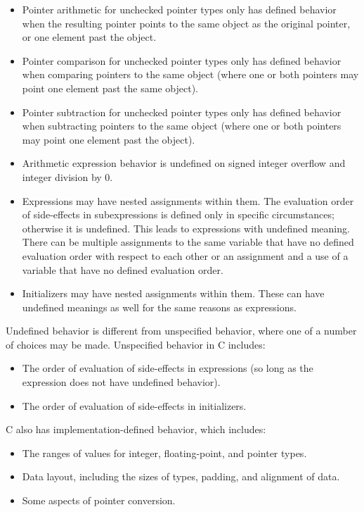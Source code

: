 \begin{itemize}
\item
  Pointer arithmetic for unchecked pointer types only has defined behavior when
  the resulting pointer points to the same object as the original pointer, or one
  element past the object.
\item
  Pointer comparison for unchecked pointer types only has defined behavior when comparing
  pointers to the same object (where one or both pointers may point one
  element past the same object).
\item
  Pointer subtraction for unchecked pointer types only has defined behavior when subtracting
  pointers to the same object (where one or both pointers may point one
  element past the object).
\item
  Arithmetic expression behavior is undefined on signed integer overflow
  and integer division by 0.
\item
  Expressions may have nested assignments within them. The evaluation
  order of side-effects in subexpressions is defined only in specific
  circumstances; otherwise it is undefined. This leads to expressions
  with undefined meaning. There can be multiple assignments to the same
  variable that have no defined evaluation order with respect to each
  other or an assignment and a use of a variable that have no defined
  evaluation order.
\item
  Initializers may have nested assignments within them. These can have
  undefined meanings as well for the same reasons as expressions.
\end{itemize}

Undefined behavior is different from unspecified behavior, where one of
a number of choices may be made. Unspecified behavior in C includes:

\begin{itemize}
\item
  The order of evaluation of side-effects in expressions (so long as the
  expression does not have undefined behavior).
\item
  The order of evaluation of side-effects in initializers.
\end{itemize}

C also has implementation-defined behavior, which includes:

\begin{itemize}
\item
  The ranges of values for integer, floating-point, and pointer types.
\item
  Data layout, including the sizes of types, padding, and alignment of
  data.
\item
  Some aspects of pointer conversion.
\end{itemize}

